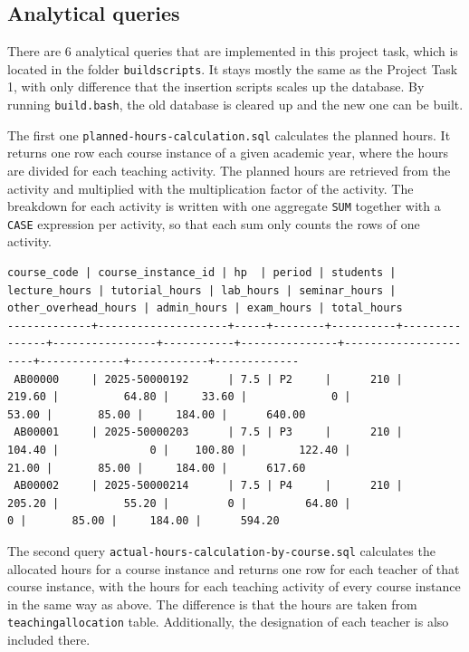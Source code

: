 \documentclass[a4paper]{scrartcl}
\renewcommand{\_}{\textunderscore\allowbreak}
\begin{document}
\subsection{Analytical queries}

There are 6 analytical queries that are implemented in this project task, which is located in the folder \texttt{build\_scripts}. It stays mostly the same as the Project Task 1, with only difference that the insertion scripts scales up the database. By running \texttt{build.bash}, the old database is cleared up and the new one can be built.

The first one \texttt{planned-hours-calculation.sql} calculates the planned hours. It returns one row each course instance of a given academic year, where the hours are divided for each teaching activity. The planned hours are retrieved from the activity and multiplied with the multiplication factor of the activity. The breakdown for each activity is written with one aggregate \texttt{SUM} together with a \texttt{CASE} expression per activity, so that each sum only counts the rows of one activity.

\begin{lstlisting}[style=output, caption={The first 3 rows of the output of \texttt{planned-hours-calculation.sql}, which returns 100018 rows in total}, label={lst:outplanned}]
 course_code | course_instance_id | hp  | period | students | lecture_hours | tutorial_hours | lab_hours | seminar_hours | other_overhead_hours | admin_hours | exam_hours | total_hours 
-------------+--------------------+-----+--------+----------+---------------+----------------+-----------+---------------+----------------------+-------------+------------+-------------
 AB00000     | 2025-50000192      | 7.5 | P2     |      210 |        219.60 |          64.80 |     33.60 |             0 |                53.00 |       85.00 |     184.00 |      640.00
 AB00001     | 2025-50000203      | 7.5 | P3     |      210 |        104.40 |              0 |    100.80 |        122.40 |                21.00 |       85.00 |     184.00 |      617.60
 AB00002     | 2025-50000214      | 7.5 | P4     |      210 |        205.20 |          55.20 |         0 |         64.80 |                    0 |       85.00 |     184.00 |      594.20
\end{lstlisting}

The second query \texttt{actual-hours-calculation-by-course.sql} calculates the allocated hours for a course instance and returns one row for each teacher of that course instance, with the hours for each teaching activity of every course instance in the same way as above. The difference is that the hours are taken from \texttt{teaching\_allocation} table. Additionally, the designation of each teacher is also included there.
\end{document}
